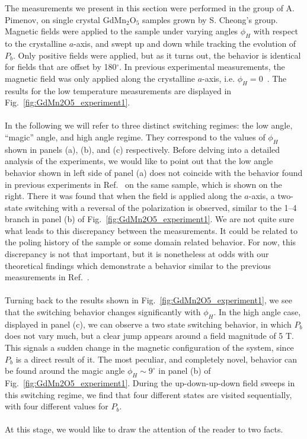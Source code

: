 The measurements we present in this section were performed in the group of A. Pimenov, on single crystal GdMn$_2$O$_5$ samples grown by S. Cheong's group.
Magnetic fields were applied to the sample under varying angles $\phi_H$ with respect to the crystalline $a$-axis, and swept up and down while tracking the evolution of $P_b$.
Only positive fields were applied, but as it turns out, the behavior is identical for fields that are offset by 180$^\circ$. 
In previous experimental measurements, the magnetic field was only applied along the crystalline $a$-axis, i.e. $\phi_H = 0$~\cite{Lee13}.
The results for the low temperature measurements are displayed in Fig.~\ref{fig:GdMn2O5_experiment1}.
\\\\
In the following we will refer to three distinct switching regimes: the low angle, ``magic'' angle, and high angle regime.
They correspond to the values of $\phi_H$ shown in panels (a), (b), and (c) respectively.
Before delving into a detailed analysis of the experiments, we would like to point out that the low angle behavior shown in left side of panel (a) does not coincide with the behavior found in previous experiments in Ref.~\cite{Lee13} on the same sample, which is shown on the right.
There it was found that when the field is applied along the $a$-axis, a two-state switching with a reversal of the polarization is observed, similar to the 1--4 branch in panel (b) of Fig.~\ref{fig:GdMn2O5_experiment1}.
We are not quite sure what leads to this discrepancy between the measurements. It could be related to the poling history of the sample or some domain related behavior.
For now, this discrepancy is not that important, but it is nonetheless at odds with our theoretical findings which demonstrate a behavior similar to the previous measurements in Ref.~\cite{Lee13}. 
\\\\
Turning back to the results shown in Fig.~\ref{fig:GdMn2O5_experiment1}, we see that the switching behavior changes significantly with $\phi_H$.
In the high angle case, displayed in panel (c), we can observe a two state switching behavior, in which $P_b$ does not vary much, but a clear jump appears around a field magnitude of 5 T.
This signals a sudden change in the magnetic configuration of the system, since $P_b$ is a direct result of it.
The most peculiar, and completely novel, behavior can be found around the magic angle $\phi_H \sim 9^\circ$ in panel (b) of Fig.~\ref{fig:GdMn2O5_experiment1}.
During the up-down-up-down field sweeps in this switching regime, we find that four different states are visited sequentially, with four different values for $P_b$.
\\\\
At this stage, we would like to draw the attention of the reader to two facts.

